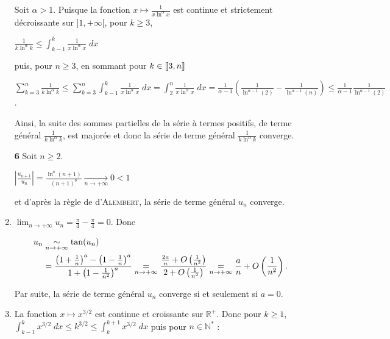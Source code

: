\documentclass[11pt,a4paper]{article}
\newcommand{\Nn}{\mathbb{N}} \newcommand{\N}{\mathbb{N}}
\newcommand{\Rr}{\mathbb{R}} \newcommand{\R}{\mathbb{R}}
\newcommand{\llbracket}{\left[\kern-0.15em\left[}
\newcommand{\rrbracket}{\right]\kern-0.15em\right]}
\begin{document}
\begin{enumerate}
Soit $\alpha>1$. Puisque la fonction $x\mapsto\frac{1}{x\ln^\alpha x}$ est continue et strictement décroissante sur $]1,+\infty[$, pour $k\geqslant3$,

\begin{center}
$\frac{1}{k\ln^\alpha k}\leqslant\int_{k-1}^{k}\frac{1}{x\ln^\alpha x}\;dx$
\end{center}

puis, pour $n\geqslant3$, en sommant pour $k\in\llbracket3,n\rrbracket$

\begin{center}
$\sum_{k=3}^{n}\frac{1}{k\ln^\alpha k}\leqslant\sum_{k=3}^{n}\int_{k-1}^{k}\frac{1}{x\ln^\alpha x}\;dx=\int_{2}^{n}\frac{1}{x\ln^\alpha x}\;dx=\frac{1}{\alpha-1}\left(\frac{1}{\ln^{\alpha-1}(2)}-\frac{1}{\ln^{\alpha-1}(n)}\right)\leqslant\frac{1}{\alpha-1}\frac{1}{\ln^{\alpha-1}(2)}$.
\end{center}

Ainsi, la suite des sommes partielles de la série à termes positifs, de terme général $\frac{1}{k\ln^\alpha k}$, est majorée et donc la série de terme général $\frac{1}{k\ln^\alpha k}$ converge.

\textbf{6} Soit $n\geqslant2$.

\begin{center}
$\left|\frac{u_{n+1}}{u_n}\right|=\frac{\ln^a(n+1)}{(n+1)^b}\underset{n\rightarrow+\infty}{\rightarrow}0 < 1$
\end{center}

et d'après la règle de d'\textsc{Alembert}, la série de terme général $u_n$ converge.

\item  $\lim_{n \rightarrow +\infty}u_n=\frac{\pi}{4}-\frac{\pi}{4}= 0$. Donc

\begin{align*}\ensuremath
u_n&\underset{n\rightarrow+\infty}{\sim}\tan(u_n)\\
 &=\frac{\left(1+\frac{1}{n}\right)^a-\left(1-\frac{1}{n}\right)^a}{1+\left(1-\frac{1}{n^2}\right)^a}\underset{n\rightarrow+\infty}{=}\frac{\frac{2a}{n}+O\left(\frac{1}{n^2}\right)}{2+O\left(\frac{1}{n^2}\right)}\underset{n\rightarrow+\infty}{=}\frac{a}{n}+O\left(\frac{1}{n^2}\right).
\end{align*}

Par suite, la série de terme général $u_n$ converge si et seulement si $a = 0$.

\item  La fonction $x\mapsto x^{3/2}$ est continue et croissante sur $\Rr^+$. Donc pour $k\geqslant 1$, $\int_{k-1}^{k}x^{3/2}\;dx\leqslant k^{3/2}\leqslant\int_{k}^{k+1}x^{3/2}\;dx$ puis pour $n\in\Nn^*$ :


\end{enumerate}
\end{document}
